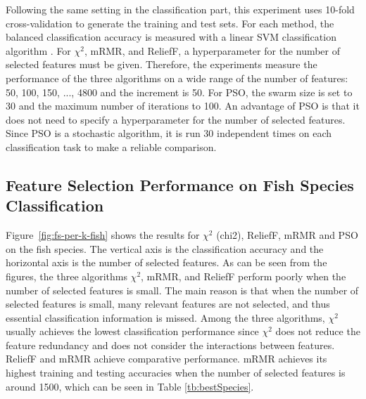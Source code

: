 \documentclass[runningheads]{llncs}
\begin{document}
Following the same setting in the classification part, this experiment uses 10-fold cross-validation to generate the training and test sets.  
For each method, the balanced classification accuracy is measured with a linear SVM classification algorithm \cite{sklearn2021feature}. 
For $\chi^2$, mRMR, and ReliefF, a hyperparameter for the number of selected features must be given. 
Therefore, the experiments measure the performance of the three algorithms on a wide range of the number of features: {50, 100, 150, ..., 4800} and the increment is 50. 
For PSO, the swarm size is set to 30 and the maximum number of iterations to 100.
An advantage of PSO is that it does not need to specify a hyperparameter for the number of selected features. 
Since PSO is a stochastic algorithm, it is run 30 independent times on each classification task to make a reliable comparison. 

\subsection{Feature Selection Performance on Fish Species Classification}

Figure~\ref{fig:fs-per-k-fish} shows the results for $\chi^2$ (chi2), ReliefF, mRMR and PSO on the fish species. 
The vertical axis is the classification accuracy and the horizontal axis is the number of selected features. 
As can be seen from the figures, the three algorithms $\chi^2$, mRMR, and ReliefF perform poorly when the number of selected features is small. 
The main reason is that when the number of selected features is small, many relevant features are not selected, and thus essential classification information is missed. 
Among the three algorithms, $\chi^2$ usually achieves the lowest classification performance since $\chi^2$ does not reduce the feature redundancy and does not consider the interactions between features.
ReliefF and mRMR achieve comparative performance. 
mRMR achieves its highest training and testing accuracies when the number of selected features is around 1500, which can be seen in Table \ref{tb:bestSpecies}. 
\end{document}
